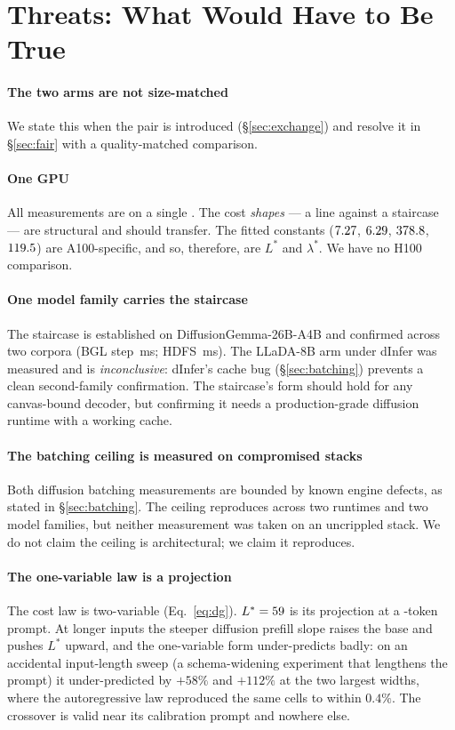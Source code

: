 \section{Threats: What Would Have to Be True}
\label{sec:threats}

\paragraph{The two arms are not size-matched}
We state this when the pair is introduced (\S\ref{sec:exchange}) and resolve it
in \S\ref{sec:fair} with a quality-matched comparison.

\paragraph{One GPU}
All measurements are on a single \gpuModel. The cost \emph{shapes} --- a line
against a staircase --- are structural and should transfer. The fitted
constants ($7.27$, $6.29$, $378.8$, $119.5$) are A100-specific, and
so, therefore, are $L^{*}$ and $\lambda^{*}$. We have no H100 comparison.

\paragraph{One model family carries the staircase}
The staircase is established on DiffusionGemma-26B-A4B and confirmed across
two corpora (BGL step \bglStep\,ms; HDFS \hdfsStep\,ms). The LLaDA-8B arm
under dInfer was measured and is \emph{inconclusive}: dInfer's cache bug
(\S\ref{sec:batching}) prevents a clean second-family confirmation. The
staircase's form should hold for any canvas-bound decoder, but confirming
it needs a production-grade diffusion runtime with a working cache.

\paragraph{The batching ceiling is measured on compromised stacks}
Both diffusion batching measurements are bounded by known engine defects,
as stated in \S\ref{sec:batching}. The ceiling reproduces across two runtimes
and two model families, but neither measurement was taken on an uncrippled
stack. We do not claim the ceiling is architectural; we claim it reproduces.

\paragraph{The one-variable law is a projection}
The cost law is two-variable (Eq.~\ref{eq:dg}). $L^{*} = 59$ is its
projection at a -token prompt. At longer inputs the steeper
diffusion prefill slope raises the base and pushes $L^{*}$ upward, and the
one-variable form under-predicts badly: on an accidental input-length sweep
(a schema-widening experiment that lengthens the prompt) it under-predicted by
$+58\%$ and $+112\%$ at the two largest widths, where the autoregressive law
reproduced the same cells to within $0.4\%$. The crossover is valid near its
calibration prompt and nowhere else.

